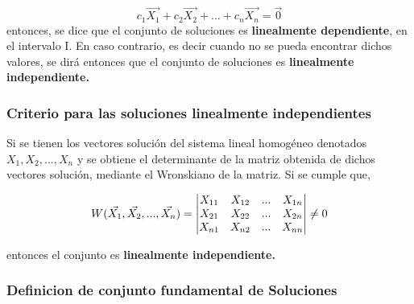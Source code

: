 \documentclass[titlepage]{article}
\begin{document}
                \begin{equation*}
                    c_1\vec{X_1} + c_2\vec{X_2} + ... + c_n\vec{X_n} = \vec{0}       
                \end{equation*}\vspace{0.2cm}
            entonces, se dice que el conjunto de soluciones es \textbf{linealmente dependiente}, en el intervalo I. En caso contrario, es decir cuando no se pueda encontrar dichos valores, se dirá entonces que el conjunto de soluciones es \textbf{linealmente independiente.}\cite{Zill2002a}  
            
        \subsubsection{Criterio para las soluciones linealmente independientes}
        
            Si se tienen los vectores solución del sistema lineal homogéneo denotados $X_1,X_2,...,X_n$ y se obtiene el determinante de la matriz obtenida de dichos vectores solución, mediante el Wronskiano de la matriz. Si se cumple que,
            
                \begin{equation*}
                    \centering
                    W(\vec{X_1},\vec{X_2},...,\vec{X_n}) = 
                    \begin{vmatrix}
                       
                        X_{11} & X_{12} &...& X_{1n} \\
                        
                        X_{21} & X_{22} &...& X_{2n} \\
                        
                        X_{n1} & X_{n2} &...& X_{nn}
                        
                    \end{vmatrix}
                    \neq 0
                \end{equation*}\vspace{0.2cm}
                
            entonces el conjunto es \textbf{linealmente independiente.} \cite{Zill2002a}
            
        \subsubsection{Definicion de conjunto fundamental de Soluciones}   
        
\end{document}
